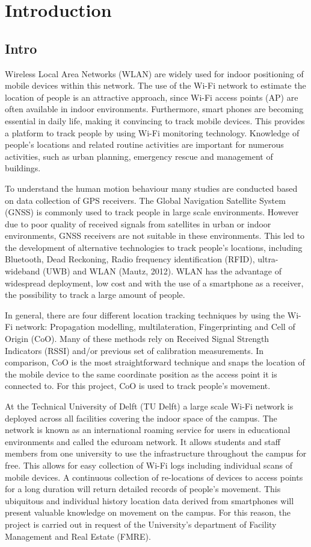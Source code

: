 \chapter{Introduction}\label{Introduction}
\section{Intro}\label{intro}
Wireless Local Area Networks (WLAN) are widely used for indoor positioning of mobile devices within this network. The use of the Wi-Fi network to estimate the location of people is an attractive approach, since Wi-Fi access points (AP) are often available in indoor environments. Furthermore, smart phones are becoming essential in daily life, making it convincing to track mobile devices. This provides a platform to track people by using Wi-Fi monitoring technology. Knowledge of people’s locations and related routine activities are important for numerous activities, such as urban planning, emergency rescue and management of buildings.

To understand the human motion behaviour many studies are conducted based on data collection of GPS receivers. The Global Navigation Satellite System (GNSS) is commonly used to track people in large scale environments. However due to poor quality of received signals from satellites in urban or indoor environments, GNSS receivers are not suitable in these environments. This led to the development of alternative technologies to track people’s locations, including Bluetooth, Dead Reckoning, Radio frequency identification (RFID), ultra-wideband (UWB) and WLAN (Mautz, 2012). WLAN has the advantage of widespread deployment, low cost and with the use of a smartphone as a receiver, the possibility to track a large amount of people.  

In general, there are four different location tracking techniques by using the Wi-Fi network: Propagation modelling, multilateration, Fingerprinting and Cell of Origin (CoO). Many of these methods rely on Received Signal Strength Indicators (RSSI) and/or previous set of calibration measurements. In comparison, CoO is the most straightforward technique and snaps the location of the mobile device to the same coordinate position as the access point it is connected to. For this project, CoO is used to track people’s movement.

At the Technical University of Delft (TU Delft) a large scale Wi-Fi network is deployed across all facilities covering the indoor space of the campus. The network is known as an international roaming service for users in educational environments and called the eduroam network. It allows students and staff members from one university to use the infrastructure throughout the campus for free. This allows for easy collection of Wi-Fi logs including individual scans of mobile devices.  A continuous collection of re-locations of devices to access points for a long duration will return detailed records of people’s movement. This ubiquitous and individual history location data derived from smartphones will present valuable knowledge on movement on the campus. For this reason, the project is carried out in request of the University’s department of Facility Management and Real Estate (FMRE). 

